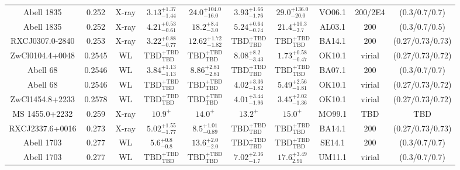 \begin{table}
\begin{tabular}{cccccccccc}
Abell 1835 & 0.252 & X-ray & ${3.13}^{+1.37}_{-1.44}$ & ${24.0}^{+104.0}_{-16.0}$ & ${3.93}^{+1.66}_{-1.76}$ & ${29.0}^{+136.0}_{-20.0}$ & VO06.1 & 200/2E4 & (0.3/0.7/0.7) \\
Abell 1835 & 0.252 & X-ray & ${4.21}^{+0.53}_{-0.61}$ & ${18.2}^{+8.4}_{-3.0}$ & ${5.24}^{+0.64}_{-0.74}$ & ${21.4}^{+10.3}_{-3.7}$ & AL03.1 & 200 & (0.3/0.7/0.5) \\
RXCJ0307.0-2840 & 0.253 & X-ray & ${3.22}^{+0.88}_{-0.77}$ & ${12.62}^{+1.72}_{-1.82}$ & ${\mathrm{TBD}}^{+\mathrm{TBD}}_{\mathrm{TBD}}$ & ${\mathrm{TBD}}^{+\mathrm{TBD}}_{\mathrm{TBD}}$ & BA14.1 & 200 & (0.27/0.73/0.73) \\
ZwCl0104.4+0048 & 0.2545 & WL & ${\mathrm{TBD}}^{+\mathrm{TBD}}_{\mathrm{TBD}}$ & ${\mathrm{TBD}}^{+\mathrm{TBD}}_{\mathrm{TBD}}$ & ${8.08}^{+8.2}_{-3.43}$ & ${1.73}^{+0.58}_{-0.47}$ & OK10.1 & virial & (0.27/0.73/0.72) \\
Abell 68 & 0.2546 & WL & ${3.84}^{+1.13}_{-1.13}$ & ${8.86}^{+2.81}_{-2.81}$ & ${\mathrm{TBD}}^{+\mathrm{TBD}}_{\mathrm{TBD}}$ & ${\mathrm{TBD}}^{+\mathrm{TBD}}_{\mathrm{TBD}}$ & BA07.1 & 200 & (0.3/0.7/0.7) \\
Abell 68 & 0.2546 & WL & ${\mathrm{TBD}}^{+\mathrm{TBD}}_{\mathrm{TBD}}$ & ${\mathrm{TBD}}^{+\mathrm{TBD}}_{\mathrm{TBD}}$ & ${4.02}^{+3.36}_{-1.82}$ & ${5.49}^{+2.56}_{-1.81}$ & OK10.1 & virial & (0.27/0.73/0.72) \\
ZwCl1454.8+2233 & 0.2578 & WL & ${\mathrm{TBD}}^{+\mathrm{TBD}}_{\mathrm{TBD}}$ & ${\mathrm{TBD}}^{+\mathrm{TBD}}_{\mathrm{TBD}}$ & ${4.01}^{+3.44}_{-1.96}$ & ${3.45}^{+2.02}_{-1.36}$ & OK10.1 & virial & (0.27/0.73/0.72) \\
MS 1455.0+2232 & 0.259 & X-ray & ${10.9}^{+}_{}$ & ${14.0}^{+}_{}$ & ${13.2}^{+}_{}$ & ${15.0}^{+}_{}$ & MO99.1 & TBD & TBD \\
RXCJ2337.6+0016 & 0.273 & X-ray & ${5.02}^{+1.55}_{-1.77}$ & ${8.5}^{+1.01}_{-0.89}$ & ${\mathrm{TBD}}^{+\mathrm{TBD}}_{\mathrm{TBD}}$ & ${\mathrm{TBD}}^{+\mathrm{TBD}}_{\mathrm{TBD}}$ & BA14.1 & 200 & (0.27/0.73/0.73) \\
Abell 1703 & 0.277 & WL & ${5.6}^{+0.8}_{-0.8}$ & ${13.6}^{+2.0}_{-2.0}$ & ${\mathrm{TBD}}^{+\mathrm{TBD}}_{\mathrm{TBD}}$ & ${\mathrm{TBD}}^{+\mathrm{TBD}}_{\mathrm{TBD}}$ & SE14.1 & 200 & (0.3/0.7/0.7) \\
Abell 1703 & 0.277 & WL & ${\mathrm{TBD}}^{+\mathrm{TBD}}_{\mathrm{TBD}}$ & ${\mathrm{TBD}}^{+\mathrm{TBD}}_{\mathrm{TBD}}$ & ${7.02}^{+2.36}_{-1.7}$ & ${17.6}^{+3.49}_{2.91}$ & UM11.1 & virial & (0.3/0.7/0.7) \\

\end{tabular}
\end{table}
